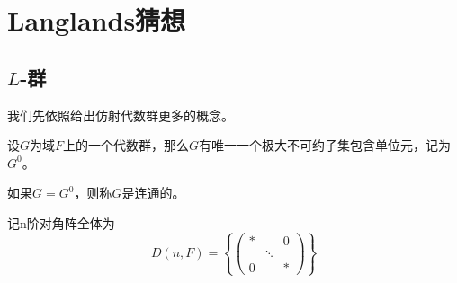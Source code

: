 \chapter{Langlands猜想}
\label{chap:langlands}

\section{$L$-群}
\label{sec:l_gp}
我们先依照给出仿射代数群更多的概念。

设$G$为域$F$上的一个代数群，那么$G$有唯一一个极大不可约子集包含单位元，记为$G^0$。

\begin{definition}
如果$G = G^0$，则称$G$是连通的。
\end{definition}
记n阶对角阵全体为
$$
D(n,F) = \left\{ \begin{pmatrix} \ast & & 0 \\ & \ddots & \\ 0 & & \ast\end{pmatrix} \right\}
$$
